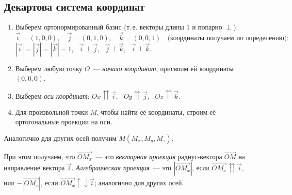 \documentclass[a4paper,11pt]{article}
\begin{document}
\subsection{Декартова система координат}
\begin{enumerate}[label=\arabic*)]
\item Выберем ортонормированный базис (т.\,е. векторы длины 1 и попарно $\perp$):
\[
\vec i=(1,0,0),\quad \vec j=(0,1,0),\quad \vec k=(0,0,1)\quad\text{(координаты получаем по определению)};
\]
$|\vec i|=|\vec j|=|\vec k|=1$, \ $\vec i\perp\vec j$, \ $\vec j\perp\vec k$, \ $\vec i\perp\vec k$.
\item Выберем любую точку $O$~--- \emph{начало координат}, присвоим ей координаты $(0,0,0)$.
\item Выберем \emph{оси координат}: $Ox\upuparrows\vec i$, \ $Oy\upuparrows\vec j$, \ $Oz\upuparrows\vec k$.
\item Для произвольной точки $M$, чтобы найти её координаты, строим её ортогональные проекции на оси.
\end{enumerate}
\begin{center}
\end{center}
Аналогично для других осей получим $M(M_x,M_y,M_z)$.

При этом получаем, что $\overrightarrow{OM_x}$~--- это \emph{векторная проекция} радиус-вектора
$\overrightarrow{OM}$ на направление вектора $\vec i$. \emph{Алгебраическая проекция}~--- это
$|\overrightarrow{OM_x}|$, если $\overrightarrow{OM_x}\upuparrows\vec i$, или $-|\overrightarrow{OM_x}|$,
если $\overrightarrow{OM_x}\uparrow\downarrow\vec i$; аналогично для других осей.
\end{document}
